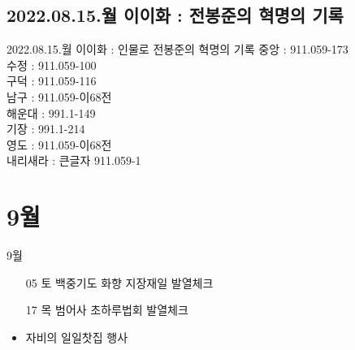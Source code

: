 \documentclass[aspectratio=1610,17pt,xcolor=pdftex,dvipsnames,table,handout]{beamer}
\begin{document}
		\subsection{2022.08.15.월  이이화 : 전봉준의 혁명의 기록 }
		
		\begin{frame} [t,plain]
			\begin{block} {2022.08.15.월  이이화 : 인물로 전봉준의 혁명의 기록 }
중앙	:	911.059-173	\\
수정	:	911.059-100	\\
구덕	:	911.059-116	\\
남구	:	911.059-이68전	\\
해운대	:	991.1-149	\\
기장	:	991.1-214	\\
영도	:	911.059-이68전	\\
내리새라	:	큰글자 911.059-1	\\
			\end{block}
		\end{frame}


		\section{9월  }
		

		\begin{frame} [t,plain]
			\begin{block} {9월 }
			\begin{itemize}
					\item [05] 토 	백중기도 화향 지장재일 발열체크
					\item [17] 목 	범어사 초하루법회 발열체크
					\item 자비의 일일찻집 행사 
			\end{itemize}
			\end{block}
		\end{frame}



\end{document}
